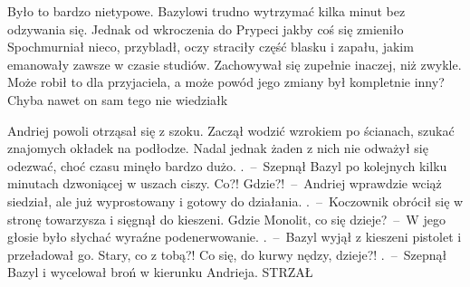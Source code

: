 \documentclass[../MAIN.tex]{subfiles}
\begin{document}
Było to bardzo nietypowe. Bazylowi trudno wytrzymać kilka minut bez odzywania się. Jednak od wkroczenia do Prypeci jakby coś się zmieniło Spochmurniał nieco, przybladł, oczy straciły część blasku i zapału, jakim emanowały zawsze w czasie studiów. Zachowywał się zupełnie inaczej, niż zwykle. Może robił to dla przyjaciela, a może powód jego zmiany był kompletnie inny? Chyba nawet on sam tego nie wiedział\3k

Andriej powoli otrząsał się z szoku. Zaczął wodzić wzrokiem po ścianach, szukać znajomych okładek na podłodze. Nadal jednak żaden z nich nie odważył się odezwać, choć czasu minęło bardzo dużo.
.~--~Szepnął Bazyl po kolejnych kilku minutach dzwoniącej w uszach ciszy.
\xx Co?! Gdzie?!~--~Andriej wprawdzie wciąż siedział, ale już wyprostowany i gotowy do działania.
.~--~Koczownik obrócił się w stronę towarzysza i sięgnął do kieszeni.
\xx Gdzie Monolit, co się dzieje?~--~W jego głosie było słychać wyraźne podenerwowanie.
.~--~Bazyl wyjął z kieszeni pistolet i przeładował go.
\xx Stary, co z tobą?! Co się, do kurwy nędzy, dzieje?!
.~--~Szepnął Bazyl i wycelował broń w kierunku Andrieja.
\qd
\sw[2em] STRZAŁ \qw
\end{document}

